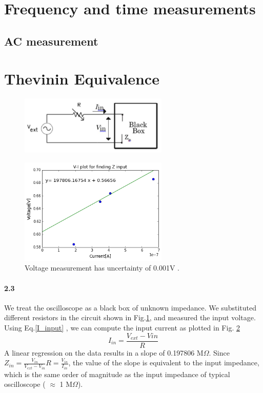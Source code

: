 \documentclass[10pt,letterpaper,oneside] {article}
\begin{document}
\section{Frequency and time measurements}
\subsection{AC measurement}\label{sec:acdc}
\section{Thevinin Equivalence}
\begin{figure}[h!]
\includegraphics[width=200pt]{figure/d_Z_input}
\label{Z_input}
\end{figure}
\begin{figure}[h!]
\includegraphics[width=200pt]{figure/Z_input_plot}
\caption{Voltage measurement has uncertainty of 0.001V . }
\label{Z_input_plots}
\end{figure}
\paragraph{\textbf{2.3}}
We treat the oscilloscope as a black box of unknown impedance.  We substituted different resistors in the circuit shown in  Fig.\ref{Z_input}, and measured the input voltage. Using Eq.\ref{I_input} , we can compute the input current as plotted in Fig. \ref{Z_input_plots}
\begin{equation}
I_{in} =\frac{V_{ext}-V{in}}{R}
\label{I_input}
\end{equation}
A linear regression on the data results in a slope of 0.197806 M$\Omega$. Since  $Z_{in}=\frac{V_{in}}{V_{ext}-V_{in}}R =\frac{V_{in}}{I_{in}}$, the value of the slope is equivalent to the  input impedance, which is the same order of magnitude as the input impedance of typical oscilloscope ( $\approx$ 1 M$\Omega$). \cite{tekronix}
\end{document}
